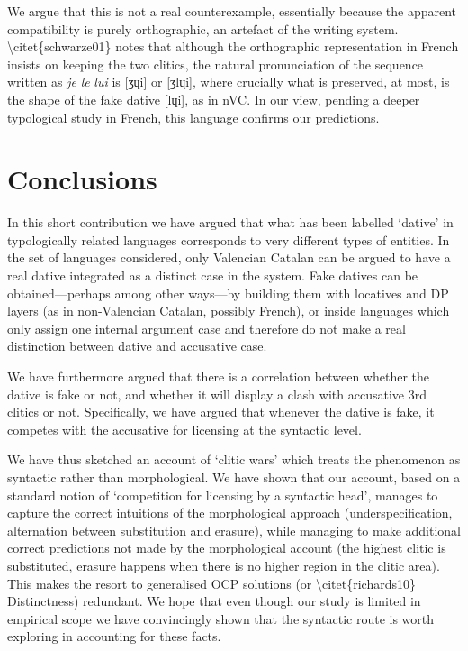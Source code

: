 \documentclass[output=paper,modfonts,nonflat]{langsci/langscibook}
\begin{document}
We argue that this is not a real counterexample, essentially because the apparent compatibility is purely orthographic, an artefact of the writing system. {\textbackslash}citet\{schwarze01\} notes that although the orthographic representation in French insists on keeping the two clitics, the natural pronunciation of the sequence written as \textit{je} \textit{le} \textit{lui} is [ʒɥi] or [ʒlɥi], where crucially what is preserved, at most, is the shape of the fake dative [lɥi], as in nVC. In our view, pending a deeper typological study in French, this language confirms our predictions. 

\section{Conclusions} %

In this short contribution we have argued that what has been labelled ‘dative’ in typologically related languages corresponds to very different types of entities. In the set of languages considered, only Valencian Catalan can be argued to have a real dative integrated as a distinct case in the system. Fake datives can be obtained—perhaps among other ways—by building them with locatives and DP layers (as in non-Valencian Catalan, possibly French), or inside languages which only assign one internal argument case and therefore do not make a real distinction between dative and accusative case. 

We have furthermore argued that there is a correlation between whether the dative is fake or not, and whether it will display a clash with accusative 3rd clitics or not. Specifically, we have argued that whenever the dative is fake, it competes with the accusative for licensing at the syntactic level. 

We have thus sketched an account of ‘clitic wars’ which treats the phenomenon as syntactic rather than morphological. We have shown that our account, based on a standard notion of ‘competition for licensing by a syntactic head’, manages to capture the correct intuitions of the morphological approach (underspecification, alternation between substitution and erasure), while managing to make additional correct predictions not made by the morphological account (the highest clitic is substituted, erasure happens when there is no higher region in the clitic area). This makes the resort to generalised OCP solutions (or {\textbackslash}citet\{richards10\} Distinctness) redundant. We hope that even though our study is limited in empirical scope we have convincingly shown that the syntactic route is worth exploring in accounting for these facts. 
\end{document}

